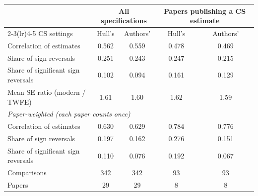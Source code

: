 \begin{tabular}{lcccc}
\toprule
 & \multicolumn{2}{c}{All specifications} & \multicolumn{2}{c}{Papers publishing a CS estimate} \\
\cmidrule(lr){2-3}\cmidrule(lr){4-5}
CS settings & Hull's & Authors' & Hull's & Authors' \\
\midrule
Correlation of estimates & 0.562 & 0.559 & 0.478 & 0.469 \\
Share of sign reversals & 0.251 & 0.243 & 0.247 & 0.215 \\
Share of significant sign reversals & 0.102 & 0.094 & 0.161 & 0.129 \\
Mean SE ratio (modern / TWFE) & 1.61 & 1.60 & 1.62 & 1.59 \\
\midrule
\multicolumn{5}{l}{\emph{Paper-weighted (each paper counts once)}} \\
Correlation of estimates & 0.630 & 0.629 & 0.784 & 0.776 \\
Share of sign reversals & 0.197 & 0.162 & 0.276 & 0.151 \\
Share of significant sign reversals & 0.110 & 0.076 & 0.192 & 0.067 \\
\midrule
Comparisons & 342 & 342 & 93 & 93 \\
Papers & 29 & 29 & 8 & 8 \\
\bottomrule
\end{tabular}
